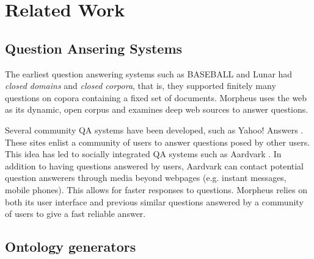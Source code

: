 \section{Related Work}
\label{sec:relatedwork}

\subsection{Question Ansering Systems} 

The earliest question answering systems such as BASEBALL \cite{Green1961} and Lunar \cite{woods1973} had \emph{closed domains} and \emph{closed corpora}, that is, they supported finitely many questions on copora containing a fixed set of documents.
Morpheus uses the web as its dynamic, open corpus and examines deep web sources 
to answer questions.

Several community QA systems have been developed, such as Yahoo! Answers \cite{yahooanswers2008}. These sites enlist a community of users to answer questions posed by other users.  This idea has led to socially integrated QA systems such as Aardvark \cite{vark2010}. In addition to having questions answered by users, Aardvark can contact potential question answerers through media beyond webpages (e.g. instant messages, mobile phones).  This allows for faster responses to questions.  Morpheus relies on both its user interface and previous similar questions answered by a community of users to give a fast reliable answer.


\subsection{Ontology generators} 
\label{sec:ontology_generators}




